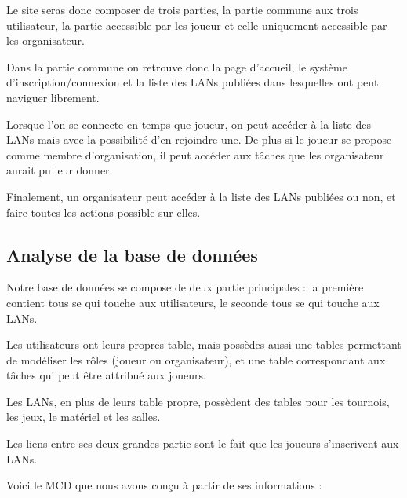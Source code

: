 \documentclass[12pt]{article}
\begin{document}
Le site seras donc composer de trois parties, la partie commune aux trois utilisateur, la partie accessible par les joueur et celle uniquement accessible par les organisateur.
\newline

Dans la partie commune on retrouve donc la page d'accueil, le système d'inscription/connexion et la liste des LANs publiées dans lesquelles ont peut naviguer librement. 
\newline

Lorsque l'on se connecte en temps que joueur, on peut accéder à la liste des LANs mais avec la possibilité d'en rejoindre une. De plus si le joueur se propose comme membre d'organisation, il peut accéder aux tâches que les organisateur aurait pu leur donner. 
\newline

Finalement, un organisateur peut accéder à la liste des LANs publiées ou non, et faire toutes les actions possible sur elles.
\newpage
\subsection{Analyse de la base de données}

Notre base de données se compose de deux partie principales : la première contient tous se qui touche aux utilisateurs, le seconde tous se qui touche aux LANs. 
\newline

Les utilisateurs ont leurs propres table, mais possèdes aussi une tables permettant de modéliser les rôles (joueur ou organisateur), et une table correspondant aux tâches qui peut être attribué aux joueurs. 
\newline

Les LANs, en plus de leurs table propre, possèdent des tables pour les tournois, les jeux, le matériel et les salles. 
\newline

Les liens entre ses deux grandes partie sont le fait que les joueurs s'inscrivent aux LANs.
\newline

Voici le MCD que nous avons conçu à partir de ses informations : 
\end{document}
